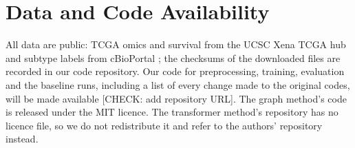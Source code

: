 \documentclass[conference]{IEEEtran}
\newcommand{\tocheck}[1]{{\color{red}[CHECK: #1]}}
\begin{document}
\section*{Data and Code Availability}
All data are public: TCGA omics and survival from the UCSC Xena TCGA hub \cite{goldman2020xena} and subtype labels from
cBioPortal \cite{cerami2012cbioportal,gao2013cbioportal}; the checksums of the downloaded files are recorded in our code
repository. Our code for preprocessing, training, evaluation and the baseline runs, including a list of every change made
to the original codes, will be made available \tocheck{add repository URL}. The graph method's code is released under
the MIT licence. The transformer method's repository has no licence file, so we do not redistribute it and refer to the
authors' repository instead.



\end{document}
